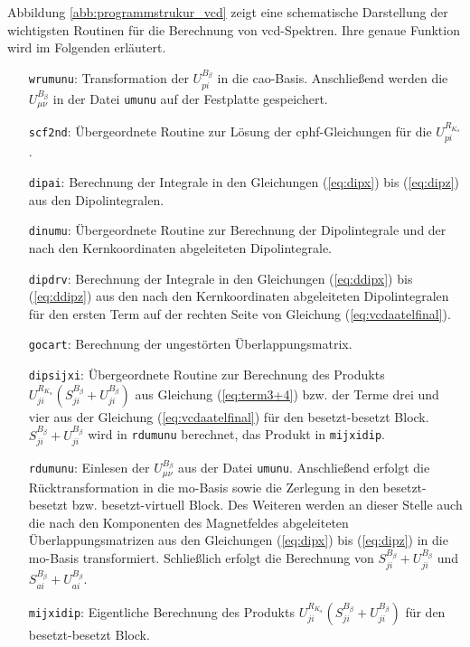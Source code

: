 	Abbildung \ref{abb:programmstrukur_vcd} zeigt eine schematische Darstellung der wichtigsten Routinen für die Berechnung von \ac{vcd}-Spektren. Ihre genaue Funktion wird im Folgenden erläutert. 
\begin{itemize}[leftmargin=60pt]
	\item[\texttt{wrumunu}:] Transformation der $U_{pi}^{B_\beta}$ in die \ac{cao}-Basis. Anschließend werden die $U_{\mu\nu}^{B_\beta}$ in der Datei \texttt{umunu} auf der Festplatte gespeichert.
	\item[\texttt{scf2nd}:] Übergeordnete Routine zur Lösung der \ac{cphf}-Gleichungen für die $U_{pi}^{R_{K_\alpha}}$.
	\item[\texttt{dipai}:] Berechnung der Integrale in den Gleichungen (\ref{eq:dipx}) bis (\ref{eq:dipz}) aus den Dipolintegralen.
	\item[\texttt{dinumu}:] Übergeordnete Routine zur Berechnung der Dipolintegrale und der nach den Kernkoordinaten abgeleiteten Dipolintegrale.
	\item[\texttt{dipdrv}:] Berechnung der Integrale in den Gleichungen (\ref{eq:ddipx}) bis (\ref{eq:ddipz}) aus den nach den Kernkoordinaten abgeleiteten Dipolintegralen für den ersten Term auf der rechten Seite von Gleichung (\ref{eq:vcdaatelfinal}).
	\item[\texttt{gocart}:] Berechnung der ungestörten Überlappungsmatrix.
	\item[\texttt{dipsijxi}:] Übergeordnete Routine zur Berechnung des Produkts $U_{ji}^{R_{K_\alpha}}\left(S_{ji}^{B_\beta}+U_{ji}^{B_\beta}\right)$ aus Gleichung (\ref{eq:term3+4}) bzw. der Terme drei und vier aus der Gleichung (\ref{eq:vcdaatelfinal}) für den besetzt-besetzt Block. $S_{ji}^{B_\beta}+U_{ji}^{B_\beta}$ wird in \texttt{rdumunu} berechnet, das Produkt in \texttt{mijxidip}.
	\item[\texttt{rdumunu}:] Einlesen der $U_{\mu\nu}^{B_\beta}$ aus der Datei \texttt{umunu}. Anschließend erfolgt die Rücktransformation in die \ac{mo}-Basis sowie die Zerlegung in den besetzt-besetzt bzw. besetzt-virtuell Block. Des Weiteren werden an dieser Stelle auch die nach den Komponenten des Magnetfeldes abgeleiteten Überlappungsmatrizen aus den Gleichungen (\ref{eq:dipx}) bis (\ref{eq:dipz}) in die \ac{mo}-Basis transformiert. Schließlich erfolgt die Berechnung von $S_{ji}^{B_\beta}+U_{ji}^{B_\beta}$ und $S_{ai}^{B_\beta}+U_{ai}^{B_\beta}$.
	\item[\texttt{mijxidip}:] Eigentliche Berechnung des Produkts $U_{ji}^{R_{K_\alpha}}\left(S_{ji}^{B_\beta}+U_{ji}^{B_\beta}\right)$ für den besetzt-besetzt Block.

\end{itemize}
